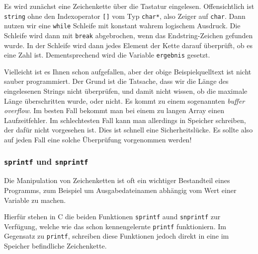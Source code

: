 Es wird zunächst eine Zeichenkette über die Tastatur eingelesen.
Offensichtlich ist \verb|string| ohne den Indexoperator \verb|[]| vom Typ \verb|char*|, also Zeiger auf \verb|char|.
Dann nutzen wir eine \verb|while| Schleife mit konstant wahrem logischem Ausdruck.
Die Schleife wird dann mit \verb|break| abgebrochen, wenn das Endstring-Zeichen gefunden wurde.
In der Schleife wird dann jedes Element der Kette darauf überprüft, ob es eine Zahl ist.
Dementsprechend wird die Variable \verb|ergebnis| gesetzt.

Vielleicht ist es Ihnen schon aufgefallen, aber der obige Beispielquelltext ist nicht sauber programmiert.
Der Grund ist die Tatsache, dass wir die Länge des eingelesenen Strings nicht überprüfen, und damit nicht wissen, ob die maximale Länge überschritten wurde, oder nicht.
Es kommt zu einem sogenannten \emph{buffer overflow}.
Im besten Fall bekommt man bei einem zu langen Array einen Laufzeitfehler.
Im schlechtesten Fall kann man allerdings in Speicher schreiben, der dafür nicht vorgesehen ist. Dies ist schnell eine Sicherheitslücke.
Es sollte also auf jeden Fall eine solche Überprüfung vorgenommen werden!

\subsubsection{\texttt{sprintf} und \texttt{snprintf}}

Die Manipulation von Zeichenketten ist oft ein wichtiger Bestandteil eines Programms, zum Beispiel um Ausgabedateinamen abh\"{a}ngig vom Wert einer Variable zu machen.

Hierf\"{u}r stehen in C die beiden Funktionen \texttt{sprintf} aund \texttt{snprintf} zur Verf\"{u}gung, welche wie das schon kennengelernte \texttt{printf} funktioniern.
Im Gegensatz zu \texttt{printf}, schreiben diese Funktionen jedoch direkt in eine im Speicher befindliche Zeichenkette.

